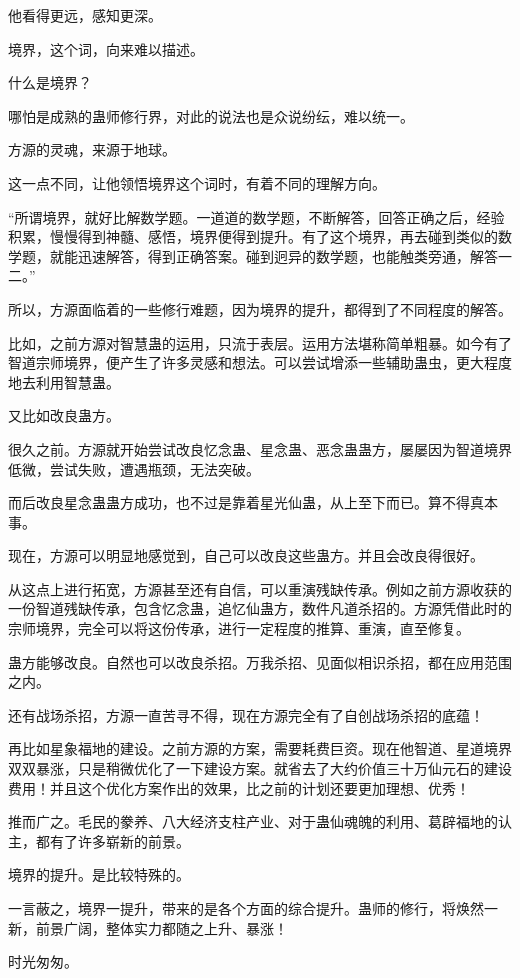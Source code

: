 \begin{this_body}
他看得更远，感知更深。

境界，这个词，向来难以描述。

什么是境界？

哪怕是成熟的蛊师修行界，对此的说法也是众说纷纭，难以统一。

方源的灵魂，来源于地球。

这一点不同，让他领悟境界这个词时，有着不同的理解方向。

“所谓境界，就好比解数学题。一道道的数学题，不断解答，回答正确之后，经验积累，慢慢得到神髓、感悟，境界便得到提升。有了这个境界，再去碰到类似的数学题，就能迅速解答，得到正确答案。碰到迥异的数学题，也能触类旁通，解答一二。”

所以，方源面临着的一些修行难题，因为境界的提升，都得到了不同程度的解答。

比如，之前方源对智慧蛊的运用，只流于表层。运用方法堪称简单粗暴。如今有了智道宗师境界，便产生了许多灵感和想法。可以尝试增添一些辅助蛊虫，更大程度地去利用智慧蛊。

又比如改良蛊方。

很久之前。方源就开始尝试改良忆念蛊、星念蛊、恶念蛊蛊方，屡屡因为智道境界低微，尝试失败，遭遇瓶颈，无法突破。

而后改良星念蛊蛊方成功，也不过是靠着星光仙蛊，从上至下而已。算不得真本事。

现在，方源可以明显地感觉到，自己可以改良这些蛊方。并且会改良得很好。

从这点上进行拓宽，方源甚至还有自信，可以重演残缺传承。例如之前方源收获的一份智道残缺传承，包含忆念蛊，追忆仙蛊方，数件凡道杀招的。方源凭借此时的宗师境界，完全可以将这份传承，进行一定程度的推算、重演，直至修复。

蛊方能够改良。自然也可以改良杀招。万我杀招、见面似相识杀招，都在应用范围之内。

还有战场杀招，方源一直苦寻不得，现在方源完全有了自创战场杀招的底蕴！

再比如星象福地的建设。之前方源的方案，需要耗费巨资。现在他智道、星道境界双双暴涨，只是稍微优化了一下建设方案。就省去了大约价值三十万仙元石的建设费用！并且这个优化方案作出的效果，比之前的计划还要更加理想、优秀！

推而广之。毛民的豢养、八大经济支柱产业、对于蛊仙魂魄的利用、葛辟福地的认主，都有了许多崭新的前景。

境界的提升。是比较特殊的。

一言蔽之，境界一提升，带来的是各个方面的综合提升。蛊师的修行，将焕然一新，前景广阔，整体实力都随之上升、暴涨！

时光匆匆。


\end{this_body}
